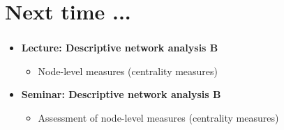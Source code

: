 \documentclass[8pt]{beamer}
\begin{document}
\section*{Next time ...}

\bgroup
{}
\begin{frame}[plain]{}
\begin{center}
\color{white}{\Huge\insertsection}
\end{center}
\end{frame}
\egroup


\begin{frame}
\frametitle{\insertsection}

\begin{itemize}

\item 	\textbf{Lecture: Descriptive network analysis B}
	\begin{itemize}
	\item Node-level measures (centrality measures)
	\end{itemize}
	
		

\medskip
\medskip


\item 	\textbf{Seminar: Descriptive network analysis B}
	\begin{itemize}
	\item Assessment of node-level measures (centrality measures)
	\end{itemize}
	

		
\end{itemize}

\end{frame}

\end{document}
